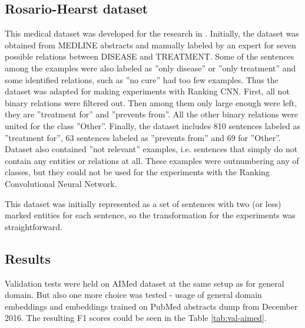 \subsection{Rosario-Hearst dataset}
This medical dataset was developed for the research in \cite{rosario2004classifying}. Initially, 
the dataset was obtained from MEDLINE abstracts and manually labeled by an expert for seven 
possible relations between DISEASE and TREATMENT. Some of the sentences among the 
examples were also labeled as ''only disease'' or ''only treatment'' and some identified relations, 
such as ''no cure'' had too few examples. Thus the dataset was adapted for making experiments 
with Ranking CNN. First, all not binary relations were filtered out. Then among them only large 
enough were left, they are ''treatment for'' and ''prevents from''. All the other binary relations were 
united for the class ''Other''. Finally, the dataset includes 810 sentences labeled as ''treatment for'', 
63 sentences labeled as ''prevents from'' and 69 for ''Other''. Dataset also contained ''not relevant'' 
examples, i.e. sentences that simply do not contain any entities or relations at all. These examples were outnumbering any of classes, but they could not be used for the experiments with the Ranking Convolutional Neural Network.

This dataset was initially represented as a set of sentences with two (or less) marked entities for each sentence, so the transformation for the experiments was straightforward.

\subsection{Results}
\label{subs:med-superv-res}
 Validation tests were held on AIMed dataset at the same setup as for general domain. But also 
one more choice was tested - usage of general domain embeddings and embeddings trained on 
PubMed abstracts dump from December 2016. The resulting F1 scores could be seen in the 
Table \ref{tab:val-aimed}.

